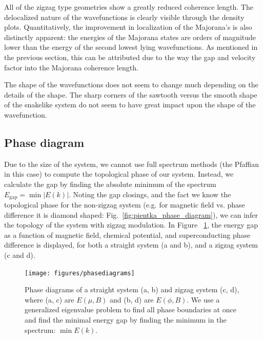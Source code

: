 			All of the zigzag type geometries show a greatly reduced coherence length.
			The delocalized nature of the wavefunctions is clearly visible through the density plots.
			Quantitatively, the improvement in localization of the Majorana's is also distinctly apparent: the energies of the Majorana states are orders of magnitude lower than the energy of the second lowest lying wavefunctions.
			As mentioned in the previous section, this can be attributed due to the way the gap and velocity factor into the Majorana coherence length.

			The shape of the wavefunctions does not seem to change much depending on the details of the shape.
			The sharp corners of the sawtooth versus the smooth shape of the snakelike system do not seem to have great impact upon the shape of the wavefunction.


		\subsection{Phase diagram}

			Due to the size of the system, we cannot use full spectrum methods (the Pfaffian in this case) to compute the topological phase of our system.
			Instead, we calculate the gap by finding the absolute minimum of the spectrum $E_\textrm{gap}=\min{|E(k)|}$.
			Noting the gap closings, and the fact we know the topological phase for the non-zigzag system (e.g. for magnetic field vs. phase difference it is diamond shaped: Fig.~\ref{fig:pientka_phase_diagram}), we can infer the topology of the system with zigzag modulation.
			In Figure ~\ref{fig:phasediagrams}, the energy gap as a function of magnetic field, chemical potential, and superconducting phase difference is displayed, for both a straight system (a and b), and a zigzag system (c and d).

			\begin{figure}[!htb]
			\centering
			\texttt{[image: figures/phasediagrams]}
			\caption{Phase diagrams of a straight system (a, b) and zigzag system (c, d), where (a, c) are $E(\mu, B)$ and (b, d) are $E(\phi, B)$.
			We use a generalized eigenvalue problem to find all phase boundaries at once and find the minimal energy gap by finding the minimum in the spectrum: $\min{E(k)}$.
			\label{fig:phasediagrams}}
			\end{figure}

